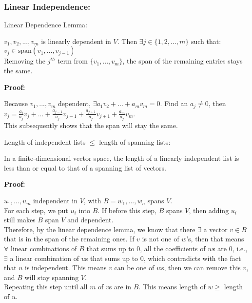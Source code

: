 \documentclass{article}
\begin{document}
\subsubsection{Linear Independence:}
Linear Dependence Lemma:\\
\begin{addmargin}[1em]{0em}
    $v_1, v_2, ..., v_m$ is linearly dependent in $V$. Then $\exists j \in \{1, 2, ..., m\}$ such that:\\
    $v_j \in \textrm{span}(v_1, ..., v_{j-1})$\\
    Removing the $j^{th}$ term from $\{v_1, ..., v_m\}$, the span of the remaining entries stays the same.\\
\end{addmargin}
\textbf{Proof:}\\
\begin{addmargin}[1em]{1em}
    Because $v_1, ..., v_m$ dependent, $\exists a_1v_2 + ... + a_mv_m = 0$. Find an $a_j \neq 0$, then $v_j = \frac{a_i}{a_j}v_j+ ... + \frac{a_{j-1}}{a_j}v_{j-1} + \frac{a_{j+1}}{a_j}v_{j+1} + \frac{a_m}{a_j}v_m$.\\
    This subsequently shows that the span will stay the same.\\
\end{addmargin}
Length of independent lists $\leq$ length of spanning lists:
\begin{addmargin}[0em]{1em}
    In a finite-dimensional vector space, the length of a linearly independent list is less than or equal to that of a spanning list of vectors.\\
\end{addmargin}
\textbf{Proof:}\\
\begin{addmargin}[1em]{0em}
    $u_1, ..., u_m$ independent in $V$, with $B = w_1, ..., w_n$ spans $V$.\\
    For each step, we put $u_i$ into $B$. If before this step, $B$ spans $V$, then adding $u_i$ still makes $B$ span $V$ and dependent.\\
    Therefore, by the linear dependence lemma, we know that there $\exists$ a vector $v \in B$ that is in the span of the remaining ones. If $v$ is not one of $w$'s, then that means $\forall$ linear combinations of $B$ that sums up to $0$, all the coefficients of $w$s are $0$, i.e., $\exists$ a linear combination of $u$s that sums up to $0$, which contradicts with the fact that $u$ is independent.
    This means $v$ can be one of $w$s, then we can remove this $v$, and $B$ will stay spanning $V$.\\
    Repeating this step until all $m$ of $v$s are in $B$. This means length of $w \geq $ length of $u$.\\
\end{addmargin}
\end{document}
